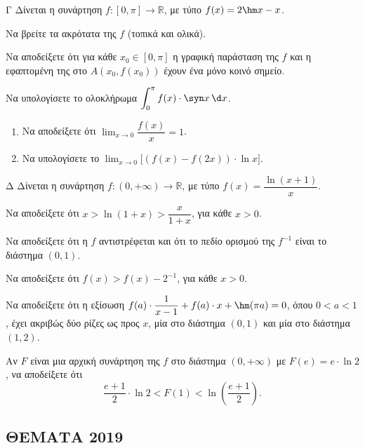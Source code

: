 \begin{thema}{Γ}
Δίνεται η συνάρτηση $f : [0, \pi] \to \mathbb{R}$, με τύπο $f(x) = 2\hm x - x$.
\begin{erwthma}
    \item Να βρείτε τα ακρότατα της $f$ (τοπικά και ολικά). 
    \item Να αποδείξετε ότι για κάθε $x_0 \in [0, \pi]$ η γραφική παράσταση της $f$ και η εφαπτομένη της στο $A(x_0, f(x_0))$ έχουν ένα μόνο κοινό σημείο. 
    \item Να υπολογίσετε το ολοκλήρωμα $\displaystyle\int_0^{\pi} f(x) \cdot \syn x\,\d x$. 
    \item
    \begin{enumerate}[label=\alph*)]
        \item Να αποδείξετε ότι $\displaystyle\lim_{x \to 0} \dfrac{f(x)}{x} = 1$. 
        \item Να υπολογίσετε το $\displaystyle\lim_{x \to 0}\bigl[(f(x) - f(2x)) \cdot \ln x\bigr]$. 
    \end{enumerate}
\end{erwthma}
\end{thema}
\begin{thema}{Δ}
Δίνεται η συνάρτηση $f : (0, +\infty) \to \mathbb{R}$, με τύπο $f(x) = \dfrac{\ln(x+1)}{x}$.
\begin{erwthma}
    \item Να αποδείξετε ότι $x > \ln(1+x) > \dfrac{x}{1+x}$, για κάθε $x > 0$. 
    \item Να αποδείξετε ότι η $f$ αντιστρέφεται και ότι το πεδίο ορισμού της $f^{-1}$ είναι το διάστημα $(0, 1)$. 
    \item Να αποδείξετε ότι $f(x) > f(x) - 2^{-1}$, για κάθε $x > 0$. 
    \item Να αποδείξετε ότι η εξίσωση $f(a) \cdot \dfrac{1}{x-1} + f(a) \cdot x + \hm(\pi a) = 0$, όπου $0 < a < 1$, έχει ακριβώς δύο ρίζες ως προς $x$, μία στο διάστημα $(0, 1)$ και μία στο διάστημα $(1, 2)$. 
    \item Αν $F$ είναι μια αρχική συνάρτηση της $f$ στο διάστημα $(0, +\infty)$ με $F(e) = e \cdot \ln 2$, να αποδείξετε ότι
    \[
    \frac{e+1}{2} \cdot \ln 2 < F(1) < \ln\!\left(\frac{e+1}{2}\right).
    \]
\end{erwthma}
\end{thema}

\subsection{ΘΕΜΑΤΑ 2019}

